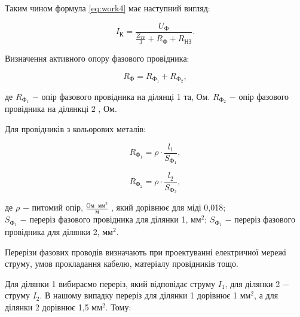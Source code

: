 \vspace{1.5em}

Таким чином формула \ref{eq:work4} має наступний вигляд:

\begin{equation}\label{eq:work9}
	I_{\text{К}} = \frac{U_{\text{Ф}}}{\frac{Z_{\text{ТР}}}{3} + R_{\text{Ф}} + R_{\text{НЗ}}}.
\end{equation}

\vspace{1.5em}

Визначення активного опору фазового провідника:

\begin{equation}\label{eq:work10}
	R_{\text{Ф}} = R_{\text{Ф}_{1}} + R_{\text{Ф}_{2}},
\end{equation}

\noindent де $R_{\text{Ф}_{1}}$ $-$ опір фазового провідника на ділянці 1 та, Ом.\newline
\hspace*{15pt} $R_{\text{Ф}_{2}}$ $-$ опір фазового провідника на ділянкці 2 , Ом.

Для провідників з кольорових металів:

\begin{equation}\label{eq:work11}
	R_{\text{Ф}_{1}} = \rho \cdot \frac{l_{1}}{S_{\text{Ф}_{1}}},
\end{equation}

\begin{equation}\label{eq:work12}
	R_{\text{Ф}_{2}} = \rho \cdot \frac{l_{2}}{S_{\text{Ф}_{2}}},
\end{equation}

\noindent де $\rho$ $-$ питомий опір, $\frac{\text{Ом} \cdot \text{мм}^{2}}{\text{м}}$ , який дорівнює для міді 0,018; \\
\hspace*{15pt} $S_{\text{Ф}_{1}}$ $-$ переріз фазового провідника для ділянки 1, $\text{мм}^{2}$;\newline
\hspace*{15pt} $S_{\text{Ф}_{1}}$ $-$ переріз фазового провідника для ділянки 2, $\text{мм}^{2}$.

\vspace{1.5em}

Перерізи фазових проводів визначають при проектуванні електричної мережі струму, умов прокладання кабелю, матеріалу провідників тощо.

Для ділянки 1 вибираємо переріз, який відповідає струму $I_{1}$, для ділянки 2 $-$ струму $I_{2}$. В нашому випадку переріз для ділянки 1 дорівнює 1 $\text{мм}^{2}$, а для ділянки 2  дорівнює 1,5 $\text{мм}^{2}$. Тому:


